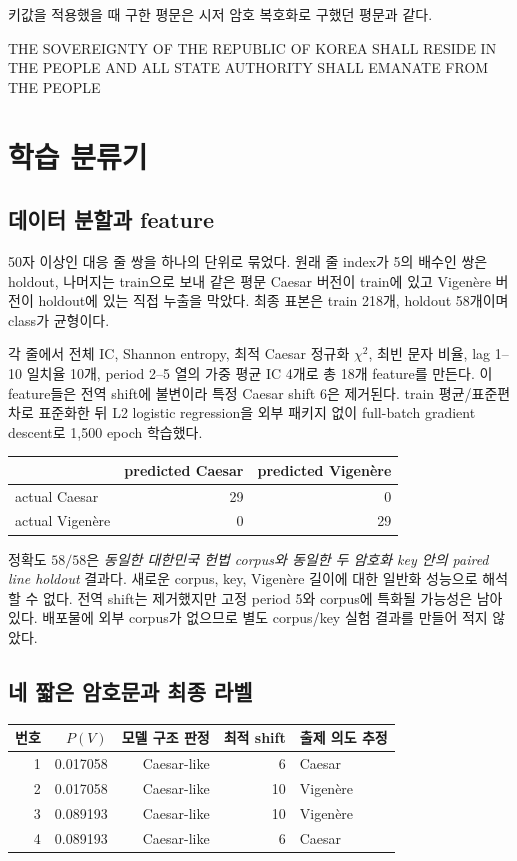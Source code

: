 \documentclass[10pt,a4paper]{article}
\begin{document}
키값을 적용했을 때 구한 평문은 시저 암호 복호화로 구했던 평문과 같다. 

THE SOVEREIGNTY OF THE REPUBLIC OF KOREA SHALL RESIDE IN THE 
PEOPLE AND ALL STATE AUTHORITY SHALL EMANATE FROM THE PEOPLE


\section{학습 분류기}

\subsection{데이터 분할과 feature}

50자 이상인 대응 줄 쌍을 하나의 단위로 묶었다. 원래 줄 index가
5의 배수인 쌍은 holdout, 나머지는 train으로 보내 같은 평문 Caesar
버전이 train에 있고 Vigenère 버전이 holdout에 있는 직접 누출을
막았다. 최종 표본은 train 218개, holdout 58개이며 class가 균형이다.

각 줄에서 전체 IC, Shannon entropy, 최적 Caesar 정규화 $\chi^2$,
최빈 문자 비율, lag 1--10 일치율 10개, period 2--5 열의 가중 평균
IC 4개로 총 18개 feature를 만든다. 이 feature들은 전역 shift에
불변이라 특정 Caesar shift 6은 제거된다. train 평균/표준편차로
표준화한 뒤 L2 logistic regression을 외부 패키지 없이 full-batch
gradient descent로 1,500 epoch 학습했다.

\begin{center}
\begin{tabular}{lrr}
\toprule
 & predicted Caesar & predicted Vigenère \\
\midrule
actual Caesar & 29 & 0 \\
actual Vigenère & 0 & 29 \\
\bottomrule
\end{tabular}
\end{center}

정확도 $58/58$은 \emph{동일한 대한민국 헌법 corpus와 동일한 두
암호화 key 안의 paired line holdout} 결과다. 새로운 corpus, key,
Vigenère 길이에 대한 일반화 성능으로 해석할 수 없다. 전역 shift는
제거했지만 고정 period 5와 corpus에 특화될 가능성은 남아 있다.
배포물에 외부 corpus가 없으므로 별도 corpus/key 실험 결과를
만들어 적지 않았다.

\subsection{네 짧은 암호문과 최종 라벨}

\begin{center}
\small
\begin{tabular}{rrrrl}
\toprule
번호 & $P(V)$ & 모델 구조 판정 & 최적 shift & 출제 의도 추정 \\
\midrule
1 & 0.017058 & Caesar-like & 6 & Caesar \\
2 & 0.017058 & Caesar-like & 10 & Vigenère \\
3 & 0.089193 & Caesar-like & 10 & Vigenère \\
4 & 0.089193 & Caesar-like & 6 & Caesar \\
\bottomrule
\end{tabular}
\end{center}
\end{document}
